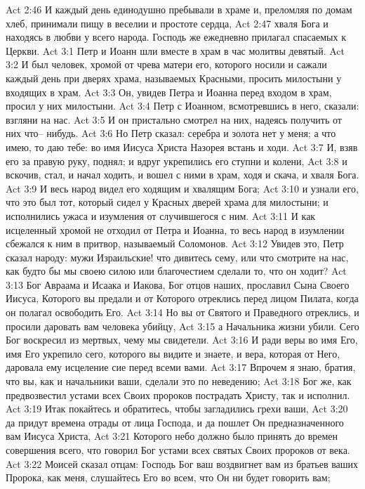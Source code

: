 Act 2:46  И каждый день единодушно пребывали в храме и, преломляя по домам хлеб, принимали пищу в веселии и простоте сердца,
Act 2:47  хваля Бога и находясь в любви у всего народа. Господь же ежедневно прилагал спасаемых к Церкви.
Act 3:1  Петр и Иоанн шли вместе в храм в час молитвы девятый.
Act 3:2  И был человек, хромой от чрева матери его, которого носили и сажали каждый день при дверях храма, называемых Красными, просить милостыни у входящих в храм.
Act 3:3  Он, увидев Петра и Иоанна перед входом в храм, просил у них милостыни.
Act 3:4  Петр с Иоанном, всмотревшись в него, сказали: взгляни на нас.
Act 3:5  И он пристально смотрел на них, надеясь получить от них что-- нибудь.
Act 3:6  Но Петр сказал: серебра и золота нет у меня; а что имею, то даю тебе: во имя Иисуса Христа Назорея встань и ходи.
Act 3:7  И, взяв его за правую руку, поднял; и вдруг укрепились его ступни и колени,
Act 3:8  и вскочив, стал, и начал ходить, и вошел с ними в храм, ходя и скача, и хваля Бога.
Act 3:9  И весь народ видел его ходящим и хвалящим Бога;
Act 3:10  и узнали его, что это был тот, который сидел у Красных дверей храма для милостыни; и исполнились ужаса и изумления от случившегося с ним.
Act 3:11  И как исцеленный хромой не отходил от Петра и Иоанна, то весь народ в изумлении сбежался к ним в притвор, называемый Соломонов.
Act 3:12  Увидев это, Петр сказал народу: мужи Израильские! что дивитесь сему, или что смотрите на нас, как будто бы мы своею силою или благочестием сделали то, что он ходит?
Act 3:13  Бог Авраама и Исаака и Иакова, Бог отцов наших, прославил Сына Своего Иисуса, Которого вы предали и от Которого отреклись перед лицом Пилата, когда он полагал освободить Его.
Act 3:14  Но вы от Святого и Праведного отреклись, и просили даровать вам человека убийцу,
Act 3:15  а Начальника жизни убили. Сего Бог воскресил из мертвых, чему мы свидетели.
Act 3:16  И ради веры во имя Его, имя Его укрепило сего, которого вы видите и знаете, и вера, которая от Него, даровала ему исцеление сие перед всеми вами.
Act 3:17  Впрочем я знаю, братия, что вы, как и начальники ваши, сделали это по неведению;
Act 3:18  Бог же, как предвозвестил устами всех Своих пророков пострадать Христу, так и исполнил.
Act 3:19  Итак покайтесь и обратитесь, чтобы загладились грехи ваши,
Act 3:20  да придут времена отрады от лица Господа, и да пошлет Он предназначенного вам Иисуса Христа,
Act 3:21  Которого небо должно было принять до времен совершения всего, что говорил Бог устами всех святых Своих пророков от века.
Act 3:22  Моисей сказал отцам: Господь Бог ваш воздвигнет вам из братьев ваших Пророка, как меня, слушайтесь Его во всем, что Он ни будет говорить вам;
